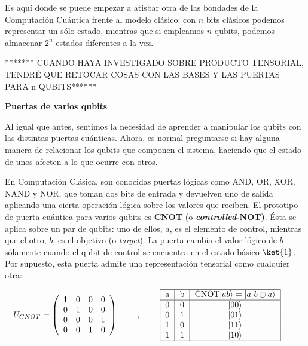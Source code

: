 \documentclass[11pt,a4paper,twoside,pdf]{article}
\numberwithin{equation}{section}
\begin{document}
		Es aquí donde se puede empezar a atisbar otra de las bondades de la Computación Cuántica frente al modelo clásico: con $n$ bits clásicos podemos representar un sólo estado, mientras que si empleamos $n$ qubits, podemos almacenar $2^n$ estados diferentes a la vez.
		
		
		\begin{center}******* CUANDO HAYA INVESTIGADO SOBRE PRODUCTO TENSORIAL,  TENDRÉ QUE RETOCAR COSAS CON LAS BASES Y LAS PUERTAS PARA n QUBITS******\end{center}
		
		\begin{flushleft}{\textbf{Puertas de varios qubits }}\end{flushleft}
		
			Al igual que antes, sentimos la necesidad de aprender a manipular los qubits con las distintas puertas cuánticas. Ahora, es normal preguntarse si hay alguna manera de relacionar los qubits que componen el sistema, haciendo que el estado de unos afecten a lo que ocurre con otros. 
		
			En Computación Clásica, son conocidas puertas lógicas como AND, OR, XOR, NAND y NOR, que toman dos bits de entrada y devuelven uno de salida aplicando una cierta operación lógica sobre los valores que reciben. El prototipo de puerta cuántica para varios qubits es \textbf{CNOT} (o \textbf{\textit{controlled}-NOT)}. Ésta se aplica sobre un par de qubits: uno de ellos, $a$, es el elemento de control, mientras que el otro, $b$, es el objetivo (o \textit{target}). La puerta cambia el valor lógico de $b$ sólamente cuando el qubit de control se encuentra en el estado básico $\ket{1}$. Por supuesto, esta puerta admite una representación tensorial como cualquier otra:
		
				\begin{equation} \label{eq: CNOT}
					U_{CNOT} = \left(\begin{array}{cccc}
					1 & 0 & 0 & 0\\
					0 & 1 & 0 & 0\\
					0 & 0 & 0 & 1\\
					0 & 0 & 1 & 0
					\end{array}\right)										\qquad \;	,	\;\qquad
					\begin{tabular}{| c | c | c | }
							\hline
								a & b & CNOT$|ab\rangle=|a\ b\oplus a\rangle$ \\ \hline
								0 & 0 & $|00\rangle$ \\
								0 & 1 &  $|01\rangle$  \\
								1 & 0 &  $|11\rangle$ \\
								1 & 1 &  $|10\rangle$ \\ \hline
					\end{tabular}			\qquad
				\end{equation}
			
\end{document}
